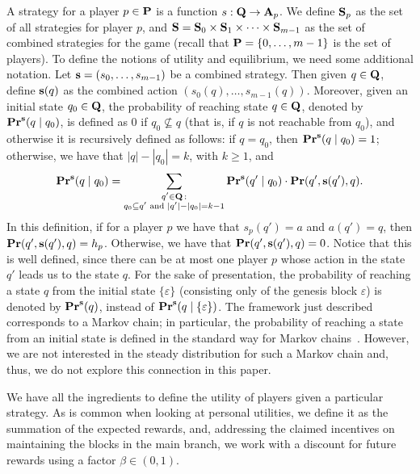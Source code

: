 A strategy for a player $p \in \mathbf{P}$ is a function $s : \mathbf{Q} \rightarrow \mathbf{A}_p$.
We define $\mathbf{S}_p$ as the set of all strategies for player $p$, and $\mathbf{S} = \mathbf{S}_0 \times \mathbf{S}_{1} \times \cdots \times \mathbf{S}_{m-1}$ as the set of combined strategies for the game (recall 
that $\mathbf{P} = \{0, \ldots, m-1\}$ is the set of players).
To define the notions of utility and equilibrium, we need some additional notation.
Let $\mathbf{s} = (s_0, \ldots, s_{m-1})$ be a combined strategy.
Then given $q \in \mathbf{Q}$, define $\mathbf{s}(q)$ as the combined action $(s_0(q), \ldots, s_{m-1}(q))$. Moreover, given an initial state $q_0 \in \mathbf{Q}$,
the probability of reaching state $q \in \mathbf{Q}$, denoted by $\mathbf{Pr}^{\mathbf{s}}(q \mid q_0)$, is defined as 0 if $q_0 \not\subseteq q$ (that is, if $q$ is not reachable from $q_0$), and otherwise it is recursively defined as follows: if $q = q_0$, then $\mathbf{Pr}^{\mathbf{s}}(q \mid q_0) = 1$; otherwise, we have that $|q| - |q_0| = k$, with $k \geq 1$, and
$$
\mathbf{Pr}^{\mathbf{s}}(q \mid q_0) =
\sum_{\substack{q' \in \mathbf{Q} \,:\\ q_0 \subseteq q' \text{ and } |q'| - |q_0| = k-1}}
 \mathbf{Pr}^{\mathbf{s}}(q' \mid q_0) \cdot \mathbf{Pr}(q', \mathbf{s}(q'), q).
 $$
In this definition, if for a player $p$ we have that $s_p(q') = a$ and $a(q') = q$, then $\mathbf{Pr}(q', \mathbf{s}(q'), q) = h_p$. Otherwise, we have that $\mathbf{Pr}(q', \mathbf{s}(q'), q) = 0$. Notice that this is well defined, since there can be at most one player $p$ whose action in the state $q'$ leads us to the state $q$.
For the sake of presentation, the probability of reaching a state $q$ from the initial state $\{\varepsilon\}$ (consisting only of the genesis block $\varepsilon$) is denoted by $\mathbf{Pr}^{\mathbf{s}}(q)$, instead of $\mathbf{Pr}^{\mathbf{s}}(q \mid \{\varepsilon\})$. 
The framework just described corresponds to a Markov chain; in particular, the probability of reaching a state from an initial state is defined in the standard way for Markov chains~\cite{MU05}. However, we are not interested in the steady distribution for such a Markov chain and, thus, we do not explore this connection in this paper.

We have all the ingredients to define the utility of players given a particular strategy. 
As is common
when looking at personal utilities, we define it as the summation of the expected rewards,
and, addressing the claimed incentives on maintaining the blocks in the main branch, we work with a discount for future rewards using a factor $\beta \in (0,1)$. 

